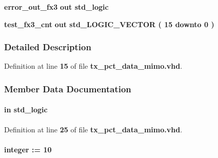\begin{DoxyCompactItemize}
\item 
{\bf error\+\_\+out\+\_\+fx3}  {\bfseries {\bfseries \textcolor{keywordflow}{out}\textcolor{vhdlchar}{ }}} {\bfseries \textcolor{comment}{std\+\_\+logic}\textcolor{vhdlchar}{ }} 
\item 
{\bf test\+\_\+fx3\+\_\+cnt}  {\bfseries {\bfseries \textcolor{keywordflow}{out}\textcolor{vhdlchar}{ }}} {\bfseries \textcolor{comment}{std\+\_\+\+L\+O\+G\+I\+C\+\_\+\+V\+E\+C\+T\+OR}\textcolor{vhdlchar}{ }\textcolor{vhdlchar}{(}\textcolor{vhdlchar}{ }\textcolor{vhdlchar}{ } \textcolor{vhdldigit}{15} \textcolor{vhdlchar}{ }\textcolor{keywordflow}{downto}\textcolor{vhdlchar}{ }\textcolor{vhdlchar}{ } \textcolor{vhdldigit}{0} \textcolor{vhdlchar}{ }\textcolor{vhdlchar}{)}\textcolor{vhdlchar}{ }} 
\end{DoxyCompactItemize}


\subsubsection{Detailed Description}


Definition at line {\bf 15} of file {\bf tx\+\_\+pct\+\_\+data\+\_\+mimo.\+vhd}.



\subsubsection{Member Data Documentation}
\paragraph[{clk}]{ {\bfseries \textcolor{keywordflow}{in}\textcolor{vhdlchar}{ }} {\bfseries \textcolor{comment}{std\+\_\+logic}\textcolor{vhdlchar}{ }} \hspace{0.3cm}{\ttfamily [Port]}}\label{classtx__pct__data__mimo_a4a4609c199d30b3adebbeb3a01276ec5}


Definition at line {\bf 25} of file {\bf tx\+\_\+pct\+\_\+data\+\_\+mimo.\+vhd}.

\paragraph[{dcmpr\+\_\+fifo}]{ {\bfseries \textcolor{vhdlchar}{ }} {\bfseries \textcolor{comment}{integer}\textcolor{vhdlchar}{ }\textcolor{vhdlchar}{ }\textcolor{vhdlchar}{\+:}\textcolor{vhdlchar}{=}\textcolor{vhdlchar}{ }\textcolor{vhdlchar}{ } \textcolor{vhdldigit}{10} \textcolor{vhdlchar}{ }} \hspace{0.3cm}{\ttfamily [Generic]}}\label{classtx__pct__data__mimo_a062a01acbbf391bf6a576a9932262fb0}



